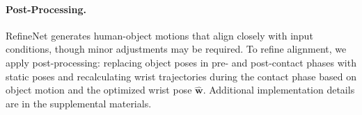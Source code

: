 


\vspace{-2mm}
\paragraph{Post-Processing.}
RefineNet generates human-object motions that align closely with input conditions, though minor adjustments may be required. To refine alignment, we apply post-processing: replacing object poses in pre- and post-contact phases with static poses and recalculating wrist trajectories during the contact phase based on object motion and the optimized wrist pose $\hat{\bm{w}}$. Additional implementation details are in the supplemental materials.






